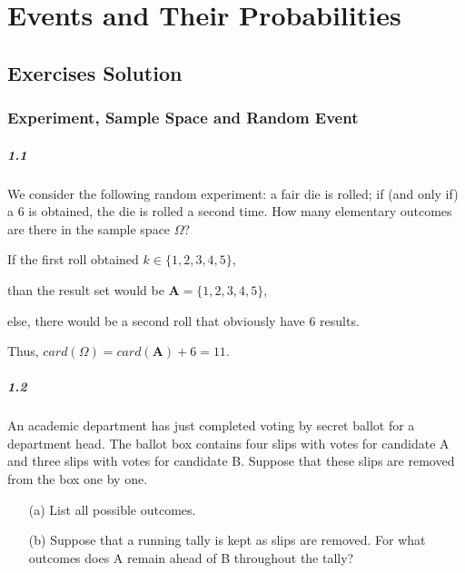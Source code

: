 



\chapter{Events and Their Probabilities}
\newpage %

\section{Exercises Solution}

\subsection{Experiment, Sample Space and Random Event}

\paragraph{1.1}
We consider the following random experiment: a fair die is rolled; if (and only if) a 6 is obtained, the die is rolled a second time. How many elementary outcomes are there in the sample space $\Omega$?
 
\solution
If the first roll obtained $k\in \{1,2,3,4,5\}$, \par
than the result set would be $\mathbf{A} = \{1,2,3,4,5\}$,\par
else, there would be a second roll that obviously have 6 results.\par
Thus, $card(\Omega) = card(\mathbf{A}) + 6 = 11$.

\paragraph{1.2}
An academic department has just completed voting by secret ballot for a department head. The ballot box contains four slips with votes for candidate A and three slips with votes for candidate B. Suppose that these slips are removed from the box one by one.
\begin{itemize}
    \item[(a)] List all possible outcomes.
    \item[(b)] Suppose that a running tally is kept as slips are removed. For what outcomes does A remain ahead of B throughout the tally?
\end{itemize}

